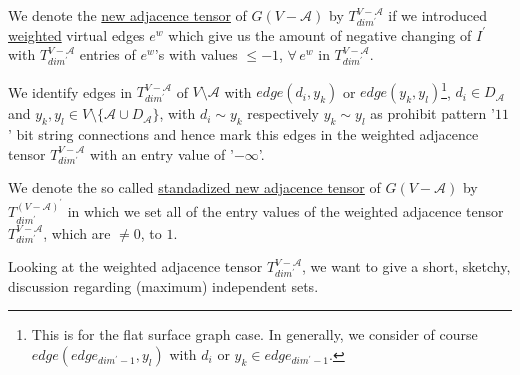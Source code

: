 \documentclass{article}
\newtheorem*{theorem A}{Theorem A}
\newtheorem*{theorem B}{N\"olker's Theorem}
\theoremstyle{remark}
\theoremstyle{remark}
\begin{document}
\vspace{0.3cm}
We denote the \underline{new adjacence tensor} of $G\left(V - \mathcal{A}\right)$ by $T^{V - \mathcal{A}}_{dim^{\prime}}$ if we introduced \underline{weighted} virtual edges $e^{w}$ which give us the amount of negative changing of $I^{\prime}$ with $T^{V - \mathcal{A}}_{dim^{\prime}}$ entries of $e^{w}$'s with values $\leq -1$, $\forall \, e^{w}$ in $T^{V - \mathcal{A}}_{dim^{\prime}}$.

\vspace{0.3cm}
We identify edges in $T^{V - \mathcal{A}}_{dim^{\prime}}$ of $V \setminus \mathcal{A}$ with $edge\left(d_{i}, y_{k}\right)$ or $edge\left(y_{k}, y_{l}\right)$\footnote{This is for the flat surface graph case. In generally, we consider of course $edge\left(edge_{dim^{\prime} - 1}, y_{l}\right)$ with $d_{i}$ or $y_{k} \in edge_{dim^{\prime} - 1}$.}, $d_{i} \in D_{\mathcal{A}}$ and $y_{k}, y_{l} \in V \setminus \{ \mathcal{A} \cup D_{\mathcal{A}} \}$, with $d_{i} \sim y_{k}$ respectively $y_{k} \sim y_{l}$ as prohibit pattern '$11$' bit string connections and hence mark this edges in the weighted adjacence tensor $T^{V - \mathcal{A}}_{dim^{\prime}}$ with an entry value of '$-\infty$'.

\vspace{0.3cm}
We denote the so called \underline{standadized new adjacence tensor} of $G\left(V - \mathcal{A}\right)$ by $T^{\left(V - \mathcal{A}\right)^{\prime}}_{dim^{\prime}}$ in which we set all of the entry values of the weighted adjacence tensor $T^{V - \mathcal{A}}_{dim^{\prime}}$, which are $\neq 0$, to $1$.

\vspace{0.3cm}
Looking at the weighted adjacence tensor $T^{V - \mathcal{A}}_{dim^{\prime}}$, we want to give a short, sketchy, discussion regarding (maximum) independent sets.
\end{document}
